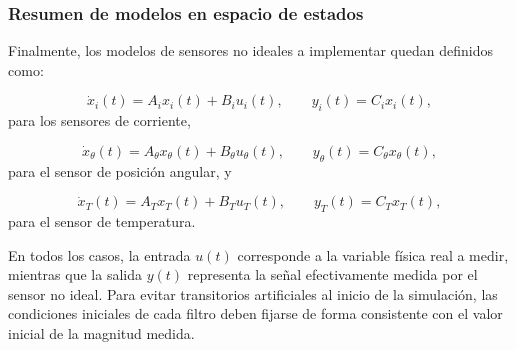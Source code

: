 \documentclass[12pt, a4paper,journal, onecolumn, compsoc]{IEEEtran}
\begin{document}
\subsubsection*{Resumen de modelos en espacio de estados}

Finalmente, los modelos de sensores no ideales a implementar quedan definidos como:

\begin{equation}
    \dot{x}_i(t)=A_i x_i(t) + B_i u_i(t), \qquad y_i(t)=C_i x_i(t),
\end{equation}
para los sensores de corriente,

\begin{equation}
    \dot{x}_\theta(t)=A_\theta x_\theta(t) + B_\theta u_\theta(t), \qquad y_\theta(t)=C_\theta x_\theta(t),
\end{equation}
para el sensor de posición angular, y

\begin{equation}
    \dot{x}_T(t)=A_T x_T(t) + B_T u_T(t), \qquad y_T(t)=C_T x_T(t),
\end{equation}
para el sensor de temperatura.

En todos los casos, la entrada $u(t)$ corresponde a la variable física real a medir, mientras que la salida $y(t)$ representa la señal efectivamente medida por el sensor no ideal. Para evitar transitorios artificiales al inicio de la simulación, las condiciones iniciales de cada filtro deben fijarse de forma consistente con el valor inicial de la magnitud medida.
\end{document}
